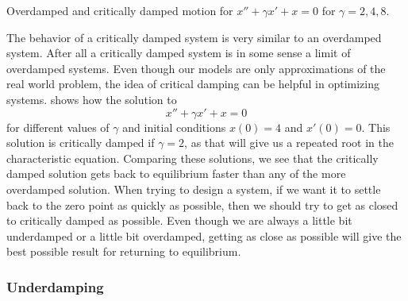 \documentclass{ximera}
\begin{document}
\begin{mywrapfig}[18]{3.25in}
    \capstart
    \caption{Overdamped and critically damped motion for $x'' + \gamma x' + x = 0$ for $\gamma = 2, 4, 8$.}\label{critdampedfast:fig}
\end{mywrapfig}

The behavior of a critically damped system is very similar to an overdamped system.  After all a critically damped system is in some sense a limit of overdamped systems. Even though our models are only approximations of the real world problem, the idea of critical damping can be helpful in optimizing systems.  shows how the solution to 
\begin{equation*}
    x'' + \gamma x' + x = 0
\end{equation*} 
for different values of $\gamma$ and initial conditions $x(0) = 4$ and $x'(0) = 0$. This solution is critically damped if $\gamma = 2$, as that will give us a repeated root in the characteristic equation. Comparing these solutions, we see that the critically damped solution gets back to equilibrium faster than any of the more overdamped solution. When trying to design a system, if we want it to settle back to the zero point as quickly as possible, then we should try to get as closed to critically damped as possible.  Even though we are always a little bit underdamped or a little bit overdamped, getting as close as possible will give the best possible result for returning to equilibrium. 


\subsubsection{Underdamping}
\end{document}
